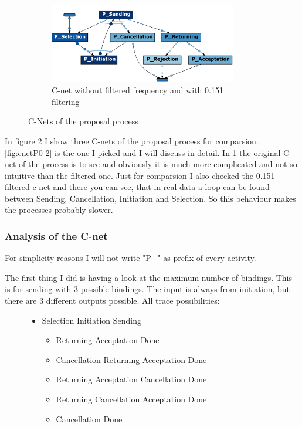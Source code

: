 \begin{figure}[!htbp]
\begin{subfigure}{0.6\textwidth}
\includegraphics[width=0.9\textwidth]{PropC-Net0-151.PNG}
\caption{C-net without filtered frequency and with 0.151 filtering}
\label{fig:cnetP0}
\end{subfigure}
\caption{C-Nets of the proposal process}
\label{fig:cNetP}
\end{figure}

In figure \ref{fig:cNetP} I show three C-nets of the proposal process for comparsion. \ref{fig:cnetP0-2} is the one I picked and I will discuss in detail. In \ref{fig:cnetP0} the original C-net of the process is to see and obviously it is much more complicated and not so intuitive than the filtered one. Just for comparsion I also checked the 0.151 filtered c-net and there you can see, that in real data a loop can be found between Sending, Cancellation, Initiation and Selection. So this behaviour makes the processes probably slower.

\subsubsection{Analysis of the C-net}
For simplicity reasons I will not write "P\_" as prefix of every activity.

The first thing I did is having a look at the maximum number of bindings. This is for sending with 3 possible bindings. The input is always from initiation, but there are 3 different outputs possible.
All trace possibilities:
\begin{figure}[!htbp]
\begin{itemize}
	\item Selection \textrightarrow Initiation \textrightarrow Sending \textrightarrow
	\begin{itemize}
	\item  Returning \textrightarrow Acceptation \textrightarrow Done
	\item Cancellation \textrightarrow Returning \textrightarrow Acceptation \textrightarrow Done
	\item  Returning \textrightarrow Acceptation \textrightarrow Cancellation  \textrightarrow Done
	\item  Returning \textrightarrow Cancellation \textrightarrow Acceptation \textrightarrow Done
	\item Cancellation \textrightarrow Done
	\end{itemize}
\end{itemize}
\end{figure}

